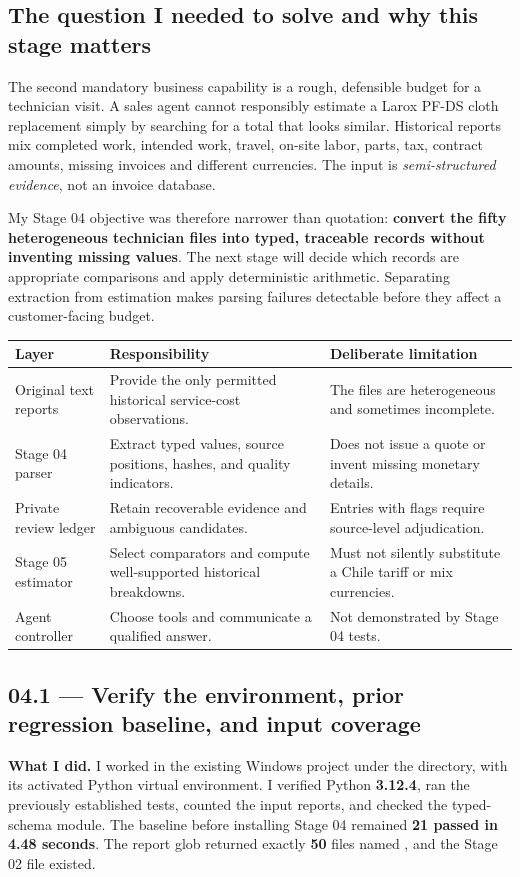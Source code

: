 \documentclass[11pt,a4paper]{article}
\DeclareRobustCommand{\code}[1]{{\ttfamily\small\detokenize{#1}}}
\begin{document}
\subsection{The question I needed to solve and why this stage matters}
The second mandatory business capability is a rough, defensible budget for a technician visit. A sales agent cannot responsibly estimate a Larox PF-DS cloth replacement simply by searching for a total that looks similar. Historical reports mix completed work, intended work, travel, on-site labor, parts, tax, contract amounts, missing invoices and different currencies. The input is \emph{semi-structured evidence}, not an invoice database.

My Stage 04 objective was therefore narrower than quotation: \textbf{convert the fifty heterogeneous technician files into typed, traceable records without inventing missing values}. The next stage will decide which records are appropriate comparisons and apply deterministic arithmetic. Separating extraction from estimation makes parsing failures detectable before they affect a customer-facing budget.

\begin{tabularx}{\textwidth}{@{}L{33mm}Y Y@{}}
\toprule
\textbf{Layer} & \textbf{Responsibility} & \textbf{Deliberate limitation}\\
\midrule
Original text reports & Provide the only permitted historical service-cost observations. & The files are heterogeneous and sometimes incomplete.\\
Stage 04 parser & Extract typed values, source positions, hashes, and quality indicators. & Does not issue a quote or invent missing monetary details.\\
Private review ledger & Retain recoverable evidence and ambiguous candidates. & Entries with flags require source-level adjudication.\\
Stage 05 estimator & Select comparators and compute well-supported historical breakdowns. & Must not silently substitute a Chile tariff or mix currencies.\\
Agent controller & Choose tools and communicate a qualified answer. & Not demonstrated by Stage 04 tests.\\
\bottomrule
\end{tabularx}

\subsection{04.1 --- Verify the environment, prior regression baseline, and input coverage}
\textbf{What I did.} I worked in the existing Windows project under the \code{interview/project} directory, with its activated Python virtual environment. I verified Python \textbf{3.12.4}, ran the previously established tests, counted the input reports, and checked the typed-schema module. The baseline before installing Stage 04 remained \textbf{21 passed in 4.48 seconds}. The report glob returned exactly \textbf{50} files named \code{FSR-*.txt}, and the Stage 02 \code{schemas.py} file existed.
\end{document}

